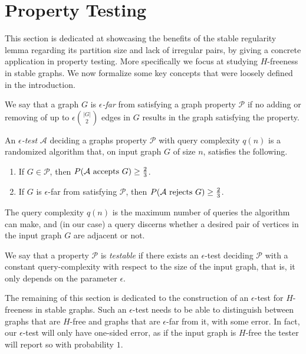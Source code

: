 \section{Property Testing} \label{sec:section_6}

    This section is dedicated at showcasing the benefits of the stable regularity lemma regarding its partition size
    and lack of irregular pairs, by giving a concrete application in property testing.
    More specifically we focus at studying $H$-freeness in stable graphs.
    We now formalize some key concepts that were loosely defined in the introduction.

    \begin{definition}
        We say that a graph $G$ is \emph{$\epsilon$-far} from satisfying a graph property $\mathcal{P}$ if no adding or
        removing of up to $\epsilon {|G| \choose 2}$ edges in $G$ results in the graph satisfying the property.
    \end{definition}

    \begin{definition} \label{def:epsilon_test}
        An \emph{$\epsilon$-test} $\mathcal{A}$ deciding a graphs property $\mathcal{P}$ with query complexity
        $q(n)$ is a randomized algorithm that, on input graph $G$ of size $n$,
        satisfies the following.
        \begin{enumerate}
            \item If $G \in \mathcal{P}$, then $P( \mathcal{A} \text{ accepts } G ) \geq \frac{2}{3}$.
            \item If $G$ is $\epsilon$-far from satisfying $\mathcal{P}$,
                then $P( \mathcal{A} \text{ rejects } G ) \geq \frac{2}{3}$.
        \end{enumerate}
        The query complexity $q(n)$ is the maximum number of queries the algorithm can make, and (in our case)
        a query discerns whether a desired pair of vertices in the input graph $G$ are adjacent or not.
    \end{definition}

    \begin{definition}
        We say that a property $\mathcal{P}$ is \emph{testable} if there exists an $\epsilon$-test deciding $\mathcal{P}$
        with a constant query-complexity with respect to the size of the input graph, that is, it only depends on the
        parameter $\epsilon$.
    \end{definition}

    The remaining of this section is dedicated to the construction of an $\epsilon$-test for $H$-freeness in stable graphs.
    Such an $\epsilon$-test needs to be able to distinguish between graphs that are $H$-free and graphs that
    are $\epsilon$-far from it, with some error.
    In fact, our $\epsilon$-test will only have one-sided error, as if the input graph is $H$-free the tester will report so
    with probability $1$.

